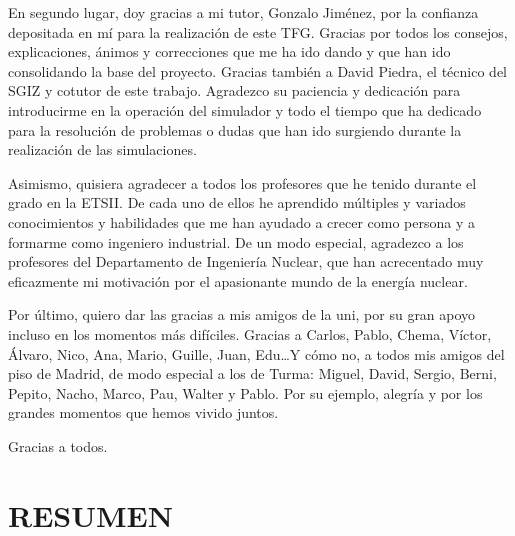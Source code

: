 \documentclass[a4paper, 11pt, spanish, twoside]{article}
\begin{document}
En segundo lugar, doy gracias a mi tutor, Gonzalo Jiménez, por la confianza depositada en mí para la realización de este TFG. Gracias por todos los consejos, explicaciones, ánimos y correcciones que me ha ido dando y que han ido consolidando la base del proyecto.
Gracias también a David Piedra, el técnico del SGIZ y cotutor de este trabajo. Agradezco su paciencia y dedicación para introducirme en la operación del simulador y todo el tiempo que ha dedicado para la resolución de problemas o dudas que han ido surgiendo durante la realización de las simulaciones.

Asimismo, quisiera agradecer a todos los profesores que he tenido durante el grado en la ETSII. De cada uno de ellos he aprendido múltiples y variados conocimientos y habilidades que me han ayudado a crecer como persona y a formarme como ingeniero industrial. De un modo especial, agradezco a los profesores del Departamento de Ingeniería Nuclear, que han acrecentado muy eficazmente mi motivación por el apasionante mundo de la energía nuclear.

Por último, quiero dar las gracias a mis amigos de la uni, por su gran apoyo incluso en los momentos más difíciles. Gracias a Carlos, Pablo, Chema, Víctor, Álvaro, Nico, Ana, Mario, Guille, Juan, Edu\dots Y cómo no, a todos mis amigos del piso de Madrid, de modo especial a los de Turma: Miguel, David, Sergio, Berni, Pepito, Nacho, Marco, Pau, Walter y Pablo. Por su ejemplo, alegría y por los grandes momentos que hemos vivido juntos.

Gracias a todos.

\afterpage{\blankpage} %

\newpage
\section*{RESUMEN} %
{} %
\end{document}
